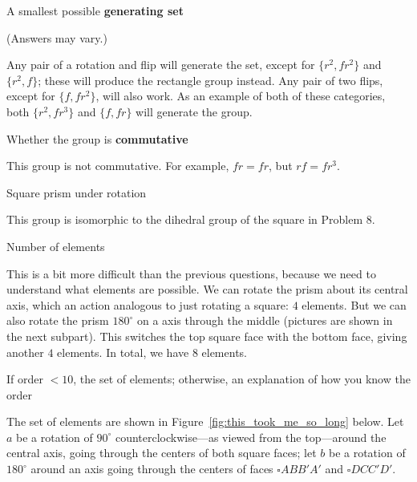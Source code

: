 \documentclass[../key.tex]{subfiles}
\begin{document}
\begin{inner_problem}
\item A smallest possible \textbf{generating set}
\end{inner_problem}

\noindent(Answers may vary.)

Any pair of a rotation and flip will generate the set, except for $\{r^2,fr^2\}$ and $\{r^2,f\}$; these will produce the rectangle group instead. Any pair of two flips, except for $\{f,fr^2\}$, will also work. As an example of both of these categories, both $\{r^2,fr^3\}$ and $\{f,fr\}$ will generate the group.

\begin{inner_problem}
\item Whether the group is \textbf{commutative}
\end{inner_problem}

\noindent This group is not commutative. For example, $fr=fr$, but $rf=fr^3$.

\begin{outer_problem}
\item Square prism under rotation
\end{outer_problem}

\noindent This group is isomorphic to the dihedral group of the square in Problem 8.

\begin{inner_problem}[start=1]
\item Number of elements
\end{inner_problem}

\noindent This is a bit more difficult than the previous questions, because we need to understand what elements are possible. We can rotate the prism about its central axis, which an action analogous to just rotating a square: $4$ elements. But we can also rotate the prism $180^\circ$ on a axis through the middle (pictures are shown in the next subpart). This switches the top square face with the bottom face, giving another $4$ elements. In total, we have $8$ elements.

\begin{inner_problem}
\item If order $< 10$, the set of elements; otherwise, an explanation of how you know the order
\end{inner_problem}

\noindent The set of elements are shown in Figure~\ref{fig:this_took_me_so_long} below. Let $a$ be a rotation of $90^\circ$ counterclockwise---as viewed from the top---around the central axis, going through the centers of both square faces; let $b$ be a rotation of $180^\circ$ around an axis going through the centers of faces $\square ABB'A'$ and $\square DCC'D'$.
\end{document}
